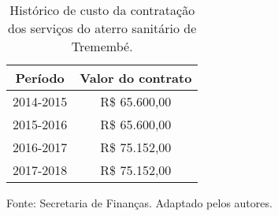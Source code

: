 \begin{table}[htbp]
\caption{Histórico de custo da contratação dos serviços do aterro sanitário de Tremembé.}
\begin{center}
\begin{tabular}{|c|c|}
\hline
\textbf{Período} & \textbf{Valor do contrato} \\ \hline
2014-2015 & R\$ 65.600,00 \\ \hline
2015-2016 & R\$ 65.600,00 \\ \hline
2016-2017 & R\$ 75.152,00 \\ \hline
2017-2018 & R\$ 75.152,00 \\ \hline
\end{tabular}
\end{center}
\label{tab:historico_custo}
Fonte: Secretaria de Finanças. Adaptado pelos autores.
\end{table}
